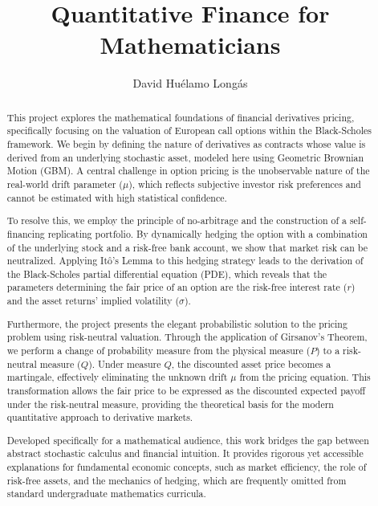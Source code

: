 \documentclass{article}
\title{Quantitative Finance for Mathematicians}
\author{David Huélamo Longás}
\date{}
\theoremstyle{definition}
\theoremstyle{remark}
\begin{document}
\maketitle
\begin{abstract}\setlength{\parindent}{0pt}\setlength{\parskip}{0.8em}
\noindent This project explores the mathematical foundations of financial derivatives pricing, specifically focusing on the valuation of European call options within the Black-Scholes framework. We begin by defining the nature of derivatives as contracts whose value is derived from an underlying stochastic asset, modeled here using Geometric Brownian Motion (GBM). A central challenge in option pricing is the unobservable nature of the real-world drift parameter ($\mu$), which reflects subjective investor risk preferences and cannot be estimated with high statistical confidence.

To resolve this, we employ the principle of no-arbitrage and the construction of a self-financing replicating portfolio. By dynamically hedging the option with a combination of the underlying stock and a risk-free bank account, we show that market risk can be neutralized. Applying Itô's Lemma to this hedging strategy leads to the derivation of the Black-Scholes partial differential equation (PDE), which reveals that the parameters determining the fair price of an option are the risk-free interest rate ($r$) and the asset returns' implied volatility ($\sigma$).

Furthermore, the project presents the elegant probabilistic solution to the pricing problem using risk-neutral valuation. Through the application of Girsanov's Theorem, we perform a change of probability measure from the physical measure ($P$) to a risk-neutral measure ($Q$). Under measure $Q$, the discounted asset price becomes a martingale, effectively eliminating the unknown drift $\mu$ from the pricing equation. This transformation allows the fair price to be expressed as the discounted expected payoff under the risk-neutral measure, providing the theoretical basis for the modern quantitative approach to derivative markets.

Developed specifically for a mathematical audience, this work bridges the gap between abstract stochastic calculus and financial intuition. It provides rigorous yet accessible explanations for fundamental economic concepts, such as market efficiency, the role of risk-free assets, and the mechanics of hedging, which are frequently omitted from standard undergraduate mathematics curricula.
\end{abstract}
\end{document}
